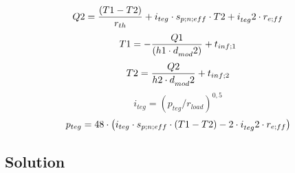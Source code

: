 \documentclass[10pt,fleqn]{article}
\newcommand{\V}[1]{\mbox{$ #1 $}}
\begin{document}
\begin{equation}
\label{EES Eqn:19}
\V{Q2}  = \frac { \left( \V{T1}  - \V{T2}  \right) }{ r_{th} }+ i_{teg} \cdot  s_{p;n;eff} \cdot  \V{T2}  + i_{teg} ^{} 2 \cdot  r_{e;ff} 
\end{equation}
\begin{equation}
\label{EES Eqn:20}
\V{T1}  = - \frac {\V{Q1}}{  \left( \V{h1}  \cdot  d_{mod} ^{} 2  \right)  }+ t_{inf;1} 
\end{equation}
\begin{equation}
\label{EES Eqn:21}
\V{T2} = \frac {\V{Q2}}{ \V{h2}  \cdot  d_{mod} ^{} 2 }+ t_{inf;2} 
\end{equation}
\begin{equation}
\label{EES Eqn:22}
i_{teg}= \left( p_{teg}/r_{load} \right) ^{0,5} 
\end{equation}
\begin{equation}
\label{EES Eqn:23}
p_{teg} = 48\cdot  \left( i_{teg} \cdot  s_{p;n;eff} \cdot   \left( \V{T1}  - \V{T2}  \right)  - 2 \cdot  i_{teg} ^{} 2 \cdot  r_{e;ff} \right)  
\end{equation}

\subsection*{Solution}
\end{document}
